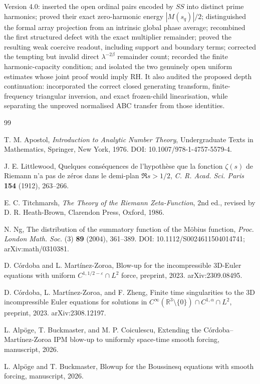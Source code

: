 \documentclass[11pt]{amsart}
\numberwithin{equation}{section}
\theoremstyle{plain}
\theoremstyle{definition}
\theoremstyle{remark}
\begin{document}
Version 4.0: inserted the open ordinal pairs encoded by $SS$ into distinct
prime harmonics; proved their exact zero-harmonic energy $|M(s_q)|/2$;
distinguished the formal array projection from an intrinsic global phase
average; recombined the first structured defect with the exact multiplier
remainder; proved the resulting weak coercive readout, including support and
boundary terms; corrected the tempting but invalid direct
$\lambda^{-2\beta}$ remainder count; recorded the finite harmonic-capacity
condition; and isolated the two genuinely open uniform estimates whose joint
proof would imply RH.  It also audited the proposed depth continuation:
incorporated the correct closed generating transform, finite-frequency
triangular inversion, and exact frozen-child linearisation, while separating
the unproved normalised ABC transfer from those identities.

\begin{thebibliography}{99}

T. M. Apostol,
\emph{Introduction to Analytic Number Theory},
Undergraduate Texts in Mathematics, Springer, New York, 1976.
DOI: 10.1007/978-1-4757-5579-4.

J. E. Littlewood,
Quelques cons\'equences de l'hypoth\`ese que la fonction $\zeta(s)$ de
Riemann n'a pas de z\'eros dans le demi-plan $\Re s>1/2$,
\emph{C. R. Acad. Sci. Paris} \textbf{154} (1912), 263--266.

E. C. Titchmarsh,
\emph{The Theory of the Riemann Zeta-Function},
2nd ed., revised by D. R. Heath-Brown, Clarendon Press, Oxford, 1986.

N. Ng,
The distribution of the summatory function of the M\"obius function,
\emph{Proc. London Math. Soc.} (3) \textbf{89} (2004), 361--389.
DOI: 10.1112/S0024611504014741; arXiv:math/0310381.

D. C\'ordoba and L. Mart\'inez-Zoroa,
Blow-up for the incompressible 3D-Euler equations with uniform
$C^{1,1/2-\varepsilon}\cap L^2$ force,
preprint, 2023.
arXiv:2309.08495.

D. C\'ordoba, L. Mart\'inez-Zoroa, and F. Zheng,
Finite time singularities to the 3D incompressible Euler equations for
solutions in $C^\infty(\mathbb R^3\setminus\{0\})\cap C^{1,\alpha}\cap L^2$,
preprint, 2023.
arXiv:2308.12197.

L. Alp\"oge, T. Buckmaster, and M. P. Coiculescu,
Extending the C\'ordoba--Mart\'inez-Zoroa IPM blow-up to uniformly space-time
smooth forcing,
manuscript, 2026.

L. Alp\"oge and T. Buckmaster,
Blowup for the Boussinesq equations with smooth forcing,
manuscript, 2026.

\end{thebibliography}
\end{document}
